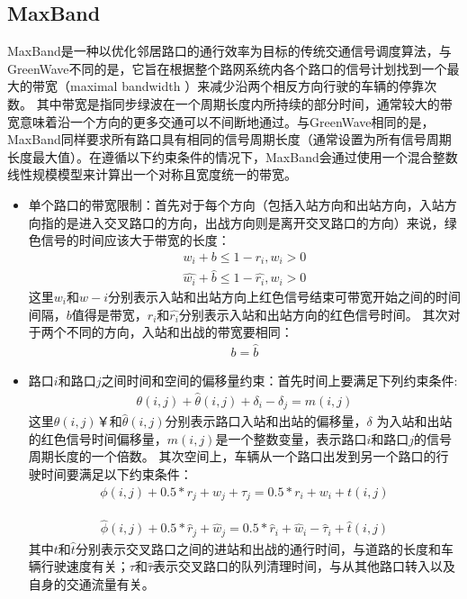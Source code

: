 \subsection{MaxBand}
MaxBand\cite{little1981maxband}是一种以优化邻居路口的通行效率为目标的传统交通信号调度算法，与GreenWave不同的是，它旨在根据整个路网系统内各个路口的信号计划找到一个最大的带宽（maximal bandwidth ）来减少沿两个相反方向行驶的车辆的停靠次数。
其中带宽是指同步绿波在一个周期长度内所持续的部分时间，通常较大的带宽意味着沿一个方向的更多交通可以不间断地通过。与GreenWave相同的是，MaxBand同样要求所有路口具有相同的信号周期长度（通常设置为所有信号周期长度最大值）。在遵循以下约束条件的情况下，MaxBand会通过使用一个混合整数线性规模模型来计算出一个对称且宽度统一的带宽。
\begin{itemize}
    \item 单个路口的带宽限制：首先对于每个方向（包括入站方向和出站方向，入站方向指的是进入交叉路口的方向，出战方向则是离开交叉路口的方向）来说，绿色信号的时间应该大于带宽的长度：
    \begin{align}
        \label{eq:band-cons-1}
        w_i + b \leq 1- r_i, w_i > 0
    \end{align}
    \begin{align}
        \label{eq:band-cons-2}
        \hat{w_i} + \hat{b} \leq 1- \hat{r_i}, w_i > 0
    \end{align}
    这里$w_i \text{和} \hat{w-i}$分别表示入站和出站方向上红色信号结束可带宽开始之间的时间间隔，$b$值得是带宽，$r_i \text{和} \hat{r_i}$分别表示入站和出站方向的红色信号时间。
    其次对于两个不同的方向，入站和出战的带宽要相同：
    \begin{align}
        \label{eq:band-cons-3}
        b = \hat{b}
    \end{align}
    \item 路口$i$和路口$j$之间时间和空间的偏移量约束：首先时间上要满足下列约束条件:
    \begin{align}
        \label{eq:temporal-cons}
        \theta(i,j) + \hat{\theta}(i,j) + \delta_i - \delta_j = m(i,j)
    \end{align}
    这里$\theta(i,j)￥\textbf{和}\hat{\theta}(i,j)$分别表示路口入站和出站的偏移量，$\delta$ 为入站和出站的红色信号时间偏移量，$m(i,j)$是一个整数变量，表示路口$i$和路口$j$的信号周期长度的一个倍数。
    其次空间上，车辆从一个路口出发到另一个路口的行驶时间要满足以下约束条件：
    \begin{align}
        \label{eq:spataril-cons-1}
        \phi(i, j)+0.5 * r_{j}+w_{j}+\tau_{j}=0.5 * r_{i}+w_{i}+t(i, j)
    \end{align}

    \begin{align}
        \label{eq:spataril-cons-2}
        \hat{\phi}(i, j)+0.5 * \hat{r}_{j}+\hat{w}_{j}=0.5 * \hat{r}_{i}+\hat{w}_{i}-\hat{\tau}_{i}+\hat{t}(i, j)
    \end{align}
    其中$t$和$\hat{t}$分别表示交叉路口之间的进站和出战的通行时间，与道路的长度和车辆行驶速度有关；$\tau \text{和} \hat{\tau}$表示交叉路口的队列清理时间，与从其他路口转入以及自身的交通流量有关。
\end{itemize}
